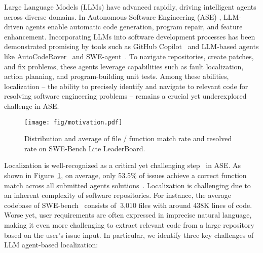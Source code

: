Large Language Models (LLMs) have advanced rapidly, driving intelligent agents across diverse domains. In Autonomous Software Engineering (ASE) \cite{devinwebpage}, LLM-driven agents enable automatic code generation, program repair, and feature enhancement.
Incorporating LLMs into software development processes has been demonstrated promising by tools such as GitHub Copilot~\cite{copilot} and LLM-based agents like AutoCodeRover~\cite{zhang2024autocoderover} and SWE-agent~\cite{yang2024swe}. To navigate repositories, create patches, and fix problems, these agents leverage 
capabilities such as fault localization, action planning, and program-building unit tests.
Among these abilities, localization -- the ability to precisely identify
and navigate to relevant code 
for resolving software engineering problems
-- remains a crucial yet underexplored challenge in ASE.

\begin{figure}[t]
    \centering
    \centerline{\texttt{[image: fig/motivation.pdf]}}
    \caption{Distribution and average of file / function match rate and resolved rate on SWE-Bench Lite LeaderBoard.}
    \label{fig:motivation}
\end{figure}


Localization is well-recognized as a critical yet challenging step~\cite{yang2024swe, xia2024agentless} in ASE. As shown in Figure~\ref{fig:motivation}, on average, only 53.5\% of issues achieve a correct function match across all submitted agents solutions~\cite{swebenchleaderboard}. Localization is challenging due to an inherent complexity of software repositories. 
For instance, the average codebase of SWE-bench~\cite{swebench} 
consists of $~$3,010 files
with around 438K lines of code.%
Worse yet, user requirements are often expressed in imprecise natural language, making it even more challenging to extract relevant code from a large repository based on the user's issue input.
In particular, we identify 
three key challenges of LLM agent-based localization: 

